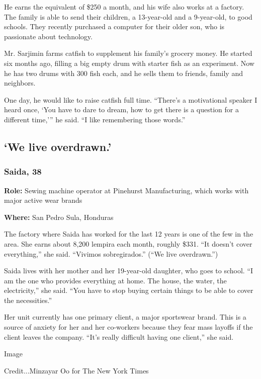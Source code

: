 He earns the equivalent of \$250 a month, and his wife also works at a
factory. The family is able to send their children, a 13-year-old and a
9-year-old, to good schools. They recently purchased a computer for
their older son, who is passionate about technology.

Mr. Sarjimin farms catfish to supplement his family's grocery money. He
started six months ago, filling a big empty drum with starter fish as an
experiment. Now he has two drums with 300 fish each, and he sells them
to friends, family and neighbors.

One day, he would like to raise catfish full time. ``There's a
motivational speaker I heard once, `You have to dare to dream, how to
get there is a question for a different time,''' he said. ``I like
remembering those words.''

\hypertarget{we-live-overdrawn}{%
\subsection{`We live overdrawn.'}\label{we-live-overdrawn}}

\hypertarget{saida-38}{%
\subsubsection{Saida, 38}\label{saida-38}}

\textbf{Role:} Sewing machine operator at Pinehurst Manufacturing, which
works with major active wear brands

\textbf{Where:} San Pedro Sula, Honduras

The factory where Saida has worked for the last 12 years is one of the
few in the area. She earns about 8,200 lempira each month, roughly
\$331. ``It doesn't cover everything,'' she said. ``Vivimos
sobregirados.'' (``We live overdrawn.'')

Saida lives with her mother and her 19-year-old daughter, who goes to
school. ``I am the one who provides everything at home. The house, the
water, the electricity,'' she said. ``You have to stop buying certain
things to be able to cover the necessities.''

Her unit currently has one primary client, a major sportswear brand.
This is a source of anxiety for her and her co-workers because they fear
mass layoffs if the client leaves the company. ``It's really difficult
having one client,'' she said.

Image

Credit...Minzayar Oo for The New York Times

